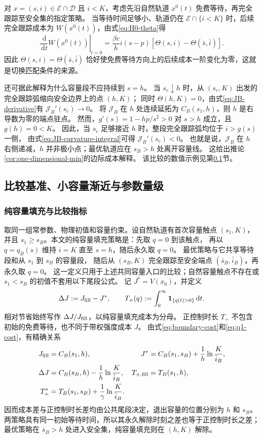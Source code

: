 \documentclass[11pt,a4paper,UTF8]{ctexart}
\theoremstyle{definition}
\newcommand{\Dcal}{\mathcal D}
\newcommand{\dd}{\,\mathrm d}
\newcommand{\one}{\mathbf 1}
\begin{document}
对 $x=(s,i)\in\mathcal E\cap\Dcal$ 且 $i<K$，考虑先沿自然轨道 $x^0(t)$ 免费等待，再完全跟踪至安全集的指定策略。
当等待时间足够小、轨道仍在 $\mathcal E\cap\{i<K\}$ 时，后续完全跟踪成本为 $W(x^0(t))$，由式\eqref{eq:H0-theta}得
\begin{equation}
 \left.\frac{\dd}{\dd t}W(x^0(t))\right|_{t=0}
 =\frac{\beta c}{h}i(s-p)
   [\Theta(s,i)-\Theta(\bar s,\bar i)].
 \label{eq:waiting-marginal-cost}
\end{equation}
因此 $\Theta(s,i)=\Theta(\bar s,\bar i)$ 恰好使免费等待方向上的后续成本一阶变化为零，这就是切换匹配条件的来源。

还可据此解释为什么容量段不应持续到 $s=h$。
当 $s_c\downarrow h$ 时，从 $(s_c,K)$ 出发的完全跟踪弧缩向安全边界上的点 $(h,K)$；
同时 $\Theta(h,K)=0$，由式\eqref{eq:JB-derivative}有 $\mathcal J_B'(s_c)\to0$。
将 $\mathcal J_B$ 在 $h$ 处连续延拓为 $C_B(s_1,h)$，则 $h$ 是右导数为零的端点驻点。
然而，$g'(s)=1-hp/s^2>0$ 对 $s>h$ 成立，且 $g(h)=0<K$。
因此，当 $s_c$ 足够接近 $h$ 时，整段完全跟踪弧均位于 $i>g(s)$ 一侧，
由式\eqref{eq:JB-curvature-integral}可得 $\mathcal J_B'(s_c)<0$。
也就是说，$\mathcal J_B$ 在 $h$ 右侧递减，$h$ 并非极小点；最优轨道应在 $s_B>h$ 处离开容量线。
这给出推论\ref{cor:one-dimensional-min}的边际成本解释。
该比较的数值示例见第\ref{sec:scaling}节。


\subsection{比较基准、小容量渐近与参数量级}
\label{sec:scaling}

\subsubsection{纯容量填充与比较指标}
取同一组常参数、物理初值和容量约束。设自然轨道有首次容量触点 $(s_1,K)$，
并且 $s_1\ge s_B$。本文的纯容量填充策略是：先取 $q=0$ 到该触点，
再以 $q=q_B(s)$ 维持 $i=K$ 直至 $s=h$，随后永久取 $q=0$。
最优策略与它共享等待段和从 $s_1$ 到 $s_B$ 的容量段，
随后从 $(s_B,K)$ 完全跟踪至安全端点 $(\bar s_B,\bar i_B)$，再永久取 $q=0$。
这一定义只用于上述共同容量入口的比较；自然容量触点不存在或 $s_1<s_B$ 的初值不套用以下尾段公式。
记 $J^*=V(x_0)$，并定义
\begin{equation}
 \Delta J:=J_{\rm fill}-J^*,\qquad
 T_+(q):=\int_0^\infty\one_{\{q(t)>0\}}\dd t.
 \label{eq:scaling-metrics}
\end{equation}
相对节省始终写作 $\Delta J/J_{\rm fill}$，以纯容量填充成本为分母。
正控制时长 $T_+$ 不包含初始的免费等待，也不同于带权强度成本 $J$。
由式\eqref{eq:boundary-cost}和\eqref{eq:q1-cost}，有精确关系
\begin{align}
 J_{\rm fill}&=C_B(s_1,h),&
 J^*&=C_B(s_1,s_B)+\frac1h\ln\frac K{\bar i_B},\notag\\
 \Delta J&=C_B(s_B,h)-\frac1h\ln\frac K{\bar i_B},&
 T_{+,\rm fill}&=T_B(s_1,h),\notag\\
 T_+^*&=T_B(s_1,s_B)+\frac1\gamma\ln\frac K{\bar i_B}.&&
 \label{eq:common-capacity-comparison}
\end{align}
因而成本差与正控制时长差均由公共尾段决定，退出容量的位置分别为 $h$ 和 $s_B$。
两策略具有同一初始等待时间，所以其永久解除时刻之差也等于正控制时长之差；
最优策略在 $\bar s_B>h$ 处进入安全集，纯容量填充则在 $(h,K)$ 解除。
\end{document}
